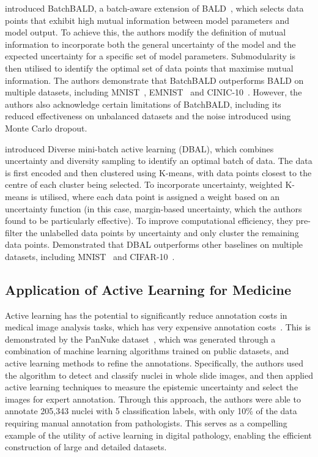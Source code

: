 \cite{kirsch2019batchbald} introduced BatchBALD, a batch-aware extension of BALD~\citep{gal2017deep}, which selects data points that exhibit high mutual information between model parameters and model output. To achieve this, the authors modify the definition of mutual information to incorporate both the general uncertainty of the model and the expected uncertainty for a specific set of model parameters. Submodularity is then utilised to identify the optimal set of data points that maximise mutual information. The authors demonstrate that BatchBALD outperforms BALD on multiple datasets, including MNIST~\citep{lecun1998gradient}, EMNIST~\citep{cohen2017emnist} and CINIC-10~\citep{darlow2018cinic}. However, the authors also acknowledge certain limitations of BatchBALD, including its reduced effectiveness on unbalanced datasets and the noise introduced using Monte Carlo dropout.

\cite{zhdanov2019diverse} introduced Diverse mini-batch active learning (DBAL), which combines uncertainty and diversity sampling to identify an optimal batch of data. The data is first encoded and then clustered using K-means, with data points closest to the centre of each cluster being selected. To incorporate uncertainty, weighted K-means is utilised, where each data point is assigned a weight based on an uncertainty function (in this case, margin-based uncertainty, which the authors found to be particularly effective). To improve computational efficiency, they pre-filter the unlabelled data points by uncertainty and only cluster the remaining data points. Demonstrated that DBAL outperforms other baselines on multiple datasets, including MNIST~\citep{lecun1998gradient} and CIFAR-10~\citep{krizhevsky2009learning}.

\subsection{Application of Active Learning for Medicine}
\label{subsec:active_applications}
Active learning has the potential to significantly reduce annotation costs in medical image analysis tasks, which has very expensive annotation costs~\citep{budd2021survey}. This is demonstrated by the PanNuke dataset~\citep{gamper2019pannuke, gamper2020pannuke}, which was generated through a combination of machine learning algorithms trained on public datasets, and active learning methods to refine the annotations. Specifically, the authors used the algorithm to detect and classify nuclei in whole slide images, and then applied active learning techniques to measure the epistemic uncertainty and select the images for expert annotation. Through this approach, the authors were able to annotate 205,343 nuclei with 5 classification labels, with only 10\% of the data requiring manual annotation from pathologists. This serves as a compelling example of the utility of active learning in digital pathology, enabling the efficient construction of large and detailed datasets.

